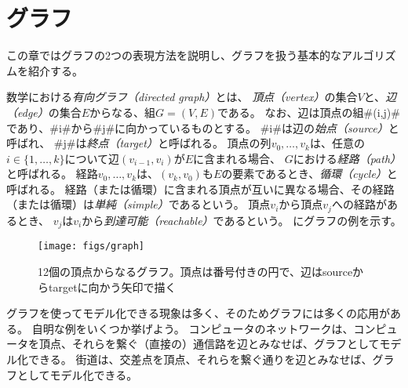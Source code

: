 \chapter{グラフ}


この章ではグラフの2つの表現方法を説明し、グラフを扱う基本的なアルゴリズムを紹介する。

数学における\emph{有向グラフ（directed graph）}とは、
%
%
\emph{頂点（vertex）}の集合$V$と、\emph{辺（edge）}の集合$E$からなる、組$G=(V,E)$である。
%
%
なお、辺は頂点の組#(i,j)#であり、#i#から#j#に向かっているものとする。
%
#i#は辺の\emph{始点（source）}と呼ばれ、
#j#は\emph{終点（target）}と呼ばれる。
頂点の列$v_0,\ldots,v_k$は、任意の$i\in\{1,\ldots,k\}$について辺$(v_{i-1},v_{i})$が$E$に含まれる場合、
$G$における\emph{経路（path）}と呼ばれる。
%
経路$v_0,\ldots,v_k$は、$(v_k,v_0)$も$E$の要素であるとき、\emph{循環（cycle）}と呼ばれる。
%
経路（または循環）に含まれる頂点が互いに異なる場合、その経路（または循環）は\emph{単純（simple）}であるという。
%
頂点$v_i$から頂点$v_j$への経路があるとき、
$v_j$は$v_i$から\emph{到達可能（reachable）}であるという。
にグラフの例を示す。

\begin{figure}
  \begin{center}
    \texttt{[image: figs/graph]}
  \end{center}
  \caption{12個の頂点からなるグラフ。頂点は番号付きの円で、辺はsourceからtargetに向かう矢印で描く}
\end{figure}

グラフを使ってモデル化できる現象は多く、そのためグラフには多くの応用がある。
自明な例をいくつか挙げよう。
コンピュータのネットワークは、コンピュータを頂点、それらを繋ぐ（直接の）通信路を辺とみなせば、グラフとしてモデル化できる。
街道は、交差点を頂点、それらを繋ぐ通りを辺とみなせば、グラフとしてモデル化できる。

